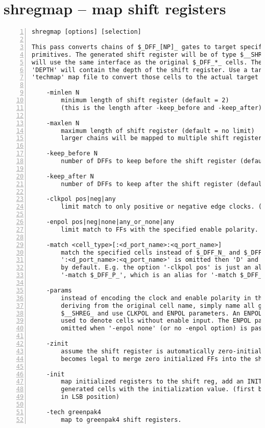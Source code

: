 \section{shregmap -- map shift registers}
\label{cmd:shregmap}
\begin{lstlisting}[numbers=left,frame=single]
    shregmap [options] [selection]

This pass converts chains of $_DFF_[NP]_ gates to target specific shift register
primitives. The generated shift register will be of type $__SHREG_DFF_[NP]_ and
will use the same interface as the original $_DFF_*_ cells. The cell parameter
'DEPTH' will contain the depth of the shift register. Use a target-specific
'techmap' map file to convert those cells to the actual target cells.

    -minlen N
        minimum length of shift register (default = 2)
        (this is the length after -keep_before and -keep_after)

    -maxlen N
        maximum length of shift register (default = no limit)
        larger chains will be mapped to multiple shift register instances

    -keep_before N
        number of DFFs to keep before the shift register (default = 0)

    -keep_after N
        number of DFFs to keep after the shift register (default = 0)

    -clkpol pos|neg|any
        limit match to only positive or negative edge clocks. (default = any)

    -enpol pos|neg|none|any_or_none|any
        limit match to FFs with the specified enable polarity. (default = none)

    -match <cell_type>[:<d_port_name>:<q_port_name>]
        match the specified cells instead of $_DFF_N_ and $_DFF_P_. If
        ':<d_port_name>:<q_port_name>' is omitted then 'D' and 'Q' is used
        by default. E.g. the option '-clkpol pos' is just an alias for
        '-match $_DFF_P_', which is an alias for '-match $_DFF_P_:D:Q'.

    -params
        instead of encoding the clock and enable polarity in the cell name by
        deriving from the original cell name, simply name all generated cells
        $__SHREG_ and use CLKPOL and ENPOL parameters. An ENPOL value of 2 is
        used to denote cells without enable input. The ENPOL parameter is
        omitted when '-enpol none' (or no -enpol option) is passed.

    -zinit
        assume the shift register is automatically zero-initialized, so it
        becomes legal to merge zero initialized FFs into the shift register.

    -init
        map initialized registers to the shift reg, add an INIT parameter to
        generated cells with the initialization value. (first bit to shift out
        in LSB position)

    -tech greenpak4
        map to greenpak4 shift registers.
\end{lstlisting}

